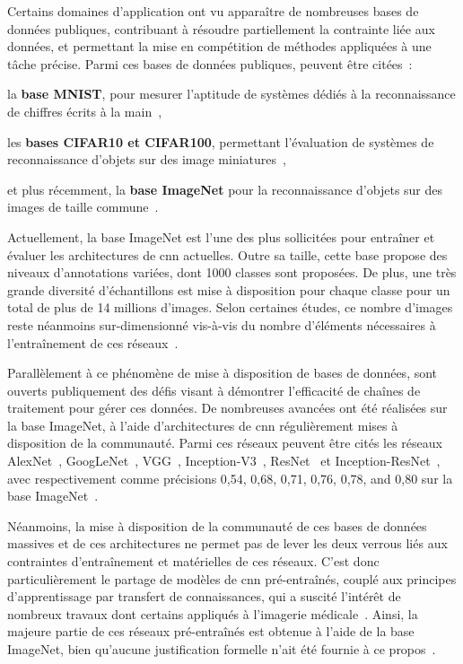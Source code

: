 Certains domaines d'application ont vu apparaître de nombreuses bases de données publiques, contribuant à résoudre partiellement la contrainte liée aux données, et permettant la mise en compétition de méthodes appliquées à une tâche précise. Parmi ces bases de données publiques, peuvent être citées~:~
\begin{inlinerate}
    \item la \textbf{base MNIST}, pour mesurer l'aptitude de systèmes dédiés à la reconnaissance de chiffres écrits à la main~\cite{lecun2010},
    \item les \textbf{bases CIFAR10 et CIFAR100}, permettant l'évaluation de systèmes de reconnaissance d'objets sur des image miniatures~\cite{Krizhevsky}, 
    \item et plus récemment, la \textbf{base ImageNet} pour la reconnaissance d'objets sur des images de taille commune~\cite{Deng2009}. 
\end{inlinerate}\par

Actuellement, la base ImageNet est l'une des plus sollicitées pour entraîner et évaluer les architectures de \gls{cnn} actuelles. Outre sa taille, cette base propose des niveaux d'annotations variées, dont 1000 classes sont proposées. De plus, une très grande diversité d'échantillons est mise à disposition pour chaque classe pour un total de plus de 14 millions d'images. Selon certaines études, ce nombre d'images reste néanmoins sur-dimensionné vis-à-vis du nombre d'éléments nécessaires à l'entraînement de ces réseaux~\cite{Huh2016}.\par

Parallèlement à ce phénomène de mise à disposition de bases de données, sont ouverts publiquement des défis visant à démontrer l'efficacité de chaînes de traitement pour gérer ces données. De nombreuses avancées ont été réalisées sur la base ImageNet, à l'aide d'architectures de \gls{cnn} régulièrement mises à disposition de la communauté. Parmi ces réseaux peuvent être cités les réseaux AlexNet~\cite{Krizhevsky2012}, GoogLeNet~\cite{Szegedy2015}, VGG~\cite{Simonyan2014}, Inception-V3~\cite{Szegedy2016}, ResNet~\cite{He2016} et Inception-ResNet~\cite{Szegedy2017}, avec respectivement comme précisions 0,54, 0,68, 0,71, 0,76, 0,78, and 0,80 sur la base ImageNet~\cite{Canziani2016}.\par

Néanmoins, la mise à disposition de la communauté de ces bases de données massives et de ces architectures ne permet pas de lever les deux verrous liés aux contraintes d'entraînement et matérielles de ces réseaux. C'est donc particulièrement le partage de modèles de \gls{cnn} pré-entraînés, couplé aux principes d'apprentissage par transfert de connaissances, qui a suscité l'intérêt de nombreux travaux dont certains appliqués à l'imagerie médicale~\cite{Litjens2017}. Ainsi, la majeure partie de ces réseaux pré-entraînés est obtenue à l'aide de la base ImageNet, bien qu'aucune justification formelle n'ait été fournie à ce propos~\cite{Huh2016}.\par
 
